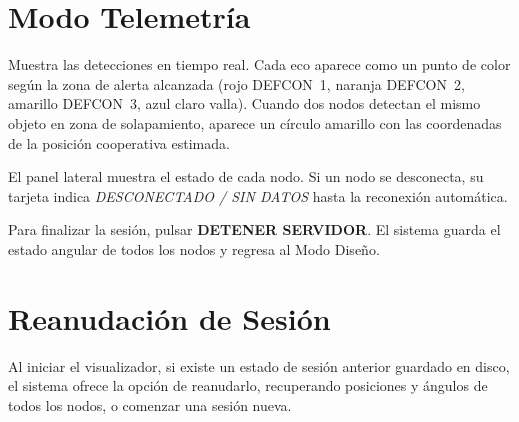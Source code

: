 \section{Modo Telemetría}

Muestra las detecciones en tiempo real. Cada eco aparece como un punto de color según la zona de alerta alcanzada (rojo DEFCON~1, naranja DEFCON~2, amarillo DEFCON~3, azul claro valla). Cuando dos nodos detectan el mismo objeto en zona de solapamiento, aparece un círculo amarillo con las coordenadas de la posición cooperativa estimada.

El panel lateral muestra el estado de cada nodo. Si un nodo se desconecta, su tarjeta indica \textit{DESCONECTADO / SIN DATOS} hasta la reconexión automática.

Para finalizar la sesión, pulsar \textbf{DETENER SERVIDOR}. El sistema guarda el estado angular de todos los nodos y regresa al Modo Diseño.

\section{Reanudación de Sesión}

Al iniciar el visualizador, si existe un estado de sesión anterior guardado en disco, el sistema ofrece la opción de reanudarlo, recuperando posiciones y ángulos de todos los nodos, o comenzar una sesión nueva.
